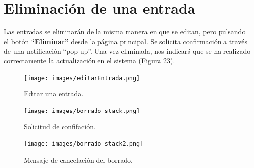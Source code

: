 \documentclass[12pt, twoside]{report}
\begin{document}
\section*{Eliminación de una entrada}
\noindent Las entradas se eliminarán de la misma manera en que se editan, pero pulsando el botón \textbf{``Eliminar''} desde la página principal. Se solicita confirmación a través de una notificación ``pop-up''. Una vez eliminada, nos indicará que se ha realizado correctamente la actualización en el sistema (Figura 23).
\begin{figure}[h]
\begin{center}
\texttt{[image: images/editarEntrada.png]}
\end{center}
\caption{\label{inicio} Editar una entrada.}
\end{figure}
\begin{figure}[h]
\begin{center}
\texttt{[image: images/borrado\_stack.png]}
\end{center}
\caption{\label{inicio} Solicitud de confifación.}
\end{figure}
\begin{figure}[h]
\begin{center}
\texttt{[image: images/borrado\_stack2.png]}
\end{center}
\caption{\label{inicio} Mensaje de cancelación del borrado.}
\end{figure}
\clearpage
\end{document}
